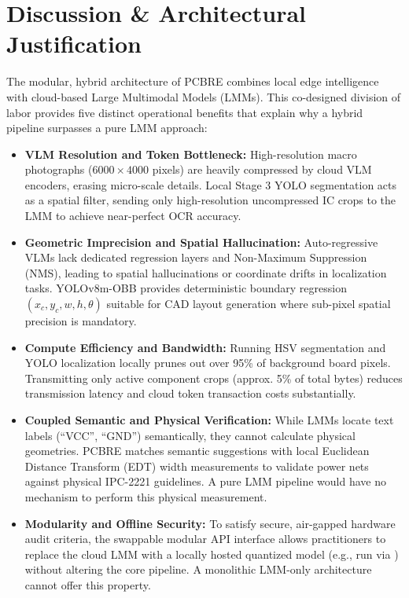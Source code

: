 \documentclass[12pt,a4paper]{report}
\begin{document}
\chapter{Discussion \& Architectural Justification}
\label{chap:discussion}

The modular, hybrid architecture of PCBRE combines local edge intelligence with cloud-based Large Multimodal Models (LMMs). This co-designed division of labor provides five distinct operational benefits that explain why a hybrid pipeline surpasses a pure LMM approach:

\begin{itemize}
  \item \textbf{VLM Resolution and Token Bottleneck:} High-resolution macro photographs ($6000 \times 4000$ pixels) are heavily compressed by cloud VLM encoders, erasing micro-scale details. Local Stage 3 YOLO segmentation acts as a spatial filter, sending only high-resolution uncompressed IC crops to the LMM to achieve near-perfect OCR accuracy.
  
  \item \textbf{Geometric Imprecision and Spatial Hallucination:} Auto-regressive VLMs lack dedicated regression layers and Non-Maximum Suppression (NMS), leading to spatial hallucinations or coordinate drifts in localization tasks. YOLOv8m-OBB provides deterministic boundary regression $(x_c, y_c, w, h, \theta)$ suitable for CAD layout generation where sub-pixel spatial precision is mandatory.
  
  \item \textbf{Compute Efficiency and Bandwidth:} Running HSV segmentation and YOLO localization locally prunes out over 95\% of background board pixels. Transmitting only active component crops (approx. 5\% of total bytes) reduces transmission latency and cloud token transaction costs substantially.
  
  \item \textbf{Coupled Semantic and Physical Verification:} While LMMs locate text labels (``VCC'', ``GND'') semantically, they cannot calculate physical geometries. PCBRE matches semantic suggestions with local Euclidean Distance Transform (EDT) width measurements to validate power nets against physical IPC-2221 guidelines. A pure LMM pipeline would have no mechanism to perform this physical measurement.
  
  \item \textbf{Modularity and Offline Security:} To satisfy secure, air-gapped hardware audit criteria, the swappable modular API interface allows practitioners to replace the cloud LMM with a locally hosted quantized model (e.g.,  run via ) without altering the core pipeline. A monolithic LMM-only architecture cannot offer this property.
\end{itemize}
\end{document}

